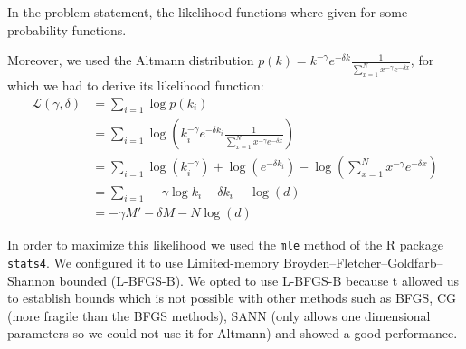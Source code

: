 \documentclass{article}
\begin{document}
In the problem statement, the likelihood functions where given for some probability functions.
\begin{table}[!htb]
\end{table}

Moreover, we used the Altmann distribution $p(k) = k^{-\gamma}e^{-\delta k}\frac{1}{\sum_{x=1}^Nx^{-\gamma}e^{-\delta x}}$, for which we had to derive its likelihood function:
\begin{align*}
    \mathcal{L}(\gamma, \delta) &= \sum_{i = 1} \log p(k_i) \\
    &= \sum_{i = 1} \log\left( k_i^{-\gamma}e^{-\delta k_i}\frac{1}{\sum_{x=1}^N x^{-\gamma}e^{-\delta x}} \right) \\
    &= \sum_{i = 1} \log(k_i^{-\gamma}) + \log(e^{-\delta k_i}) - \log(\sum_{x=1}^N x^{-\gamma}e^{-\delta x}) \\
    &= \sum_{i = 1} -\gamma\log{k_i} - \delta k_i - \log(d) \\
    &= - \gamma M' - \delta M - N \log(d)
\end{align*}

In order to maximize this likelihood we used the \verb|mle| method of the R package \verb|stats4|. We configured it to use Limited-memory Broyden–Fletcher–Goldfarb–Shannon bounded (L-BFGS-B). We opted to use L-BFGS-B because t allowed us to establish bounds which is not possible with other methods such as BFGS, CG (more fragile than the BFGS methods), SANN (only allows one dimensional parameters so we could not use it for Altmann) and showed a good performance.
\end{document}

